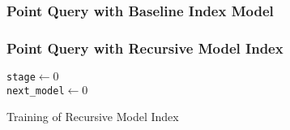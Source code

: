 \subsubsection{Point Query with Baseline Index Model}

\subsubsection{Point Query with Recursive Model Index}

\begin{algorithm}[H]
    \SetAlgoLined
     \texttt{stage$\gets 0$} \\
 	 \texttt{next\_model$\gets 0$} \\
     \caption{Training of Recursive Model Index}
\end{algorithm}